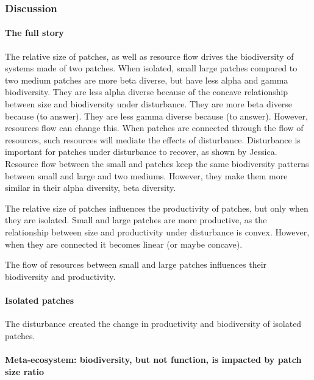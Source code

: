 \documentclass[
]{article}
\begin{document}
\hypertarget{discussion}{%
\subsubsection{Discussion}\label{discussion}}

\hypertarget{the-full-story}{%
\paragraph{The full story}\label{the-full-story}}

The relative size of patches, as well as resource flow drives the
biodiversity of systems made of two patches. When isolated, small large
patches compared to two medium patches are more beta diverse, but have
less alpha and gamma biodiversity. They are less alpha diverse because
of the concave relationship between size and biodiversity under
disturbance. They are more beta diverse because (to answer). They are
less gamma diverse because (to answer). However, resources flow can
change this. When patches are connected through the flow of resources,
such resources will mediate the effects of disturbance. Disturbance is
important for patches under disturbance to recover, as shown by Jessica.
Resource flow between the small and patches keep the same biodiversity
patterns between small and large and two mediums. However, they make
them more similar in their alpha diversity, beta diversity.

The relative size of patches influences the productivity of patches, but
only when they are isolated. Small and large patches are more
productive, as the relationship between size and productivity under
disturbance is convex. However, when they are connected it becomes
linear (or maybe concave).

The flow of resources between small and large patches influences their
biodiversity and productivity.

\hypertarget{isolated-patches}{%
\paragraph{Isolated patches}\label{isolated-patches}}

The disturbance created the change in productivity and biodiversity of
isolated patches.

\hypertarget{meta-ecosystem-biodiversity-but-not-function-is-impacted-by-patch-size-ratio}{%
\paragraph{Meta-ecosystem: biodiversity, but not function, is impacted
by patch size
ratio}\label{meta-ecosystem-biodiversity-but-not-function-is-impacted-by-patch-size-ratio}}
\end{document}
